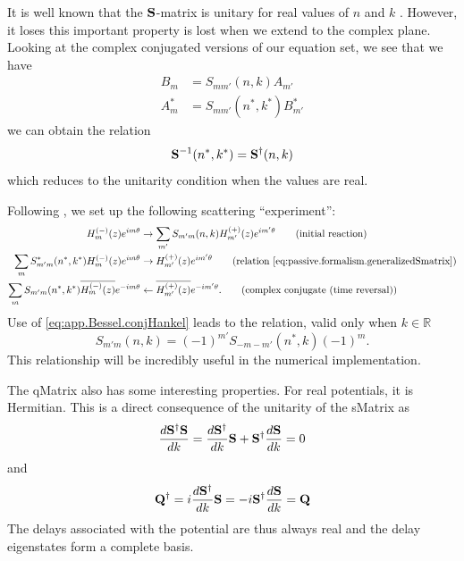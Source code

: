 It is well known that the $\mathbf{S}$-matrix is unitary 
for real values of $n$ and $k$ \cite{NEW1982}. However, 
it loses this important property is lost when we extend
to the complex plane. Looking at the complex conjugated versions
of our equation set, we see that we have
  \begin{align*}
    B_m		&= S_{mm'}(n,k)A_{m'}	\\
    A_m^*	&= S_{mm'}(n^*,k^*)B_{m'}^*
  \end{align*}
we can obtain the relation
  \begin{equation}
    \label{eq:passive.formalism.generalizedSmatrix}
    \mathbf{S}^{-1}(n^*,k^*) = \mathbf{S}^\dagger(n,k)
  \end{equation}
which reduces to the unitarity condition when 
the values are real. 

Following \cite{GAP2013}, we set up the following scattering
``experiment'':
  \begin{align*}
    H_m^{(-)}(z)e^{im\theta}					&\rightarrow \sum_{m'} S_{m'm}(n,k)H_{m'}^{(+)}(z)e^{im'\theta}	\tag{initial reaction}\\
    \sum_{m}S_{m'm}^*(n^*,k^*)H_m^{(-)}(z)e^{im\theta}		&\rightarrow H_{m'}^{(+)}(z)e^{im'\theta}			\tag{relation \eqref{eq:passive.formalism.generalizedSmatrix}}\\
    \sum_{m}S_{m'm}(n^*,k^*)\overline{H_m^{(-)}(z)}e^{-im\theta}&\leftarrow \overline{H_{m'}^{(+)}(z)}e^{-im'\theta}.		\tag{complex conjugate (time reversal)}
  \end{align*}
Use of \eqref{eq:app.Bessel.conjHankel}
leads to the relation, valid only when $k\in\mathbb{R}$
  \begin{equation}
    \label{eq:passive.formalism.timeReversalSymmetryReal}
    S_{m'm}(n,k) = (-1)^{m'}S_{-m-m'}(n^*,k)(-1)^m.
  \end{equation}
This relationship will be incredibly useful in the numerical implementation.

The \gls{qMatrix} also has some interesting properties. For real
potentials, it is Hermitian. This is a direct consequence of the
unitarity of the \gls{sMatrix} as 
  \begin{equation}
   \frac{d\mathbf{S}^\dagger\mathbf{S}}{dk} = \frac{d\mathbf{S}^\dagger}{dk}\mathbf{S}+\mathbf{S}^\dagger\frac{d\mathbf{S}}{dk} = 0
  \end{equation}
and
  \begin{equation}
   \mathbf{Q}^\dagger = i\frac{d\mathbf{S}^\dagger}{dk}\mathbf{S} = -i\mathbf{S}^\dagger\frac{d\mathbf{S}}{dk} = \mathbf{Q}
  \end{equation}
The delays associated with the potential are thus always real
and the delay eigenstates form a complete basis. 


